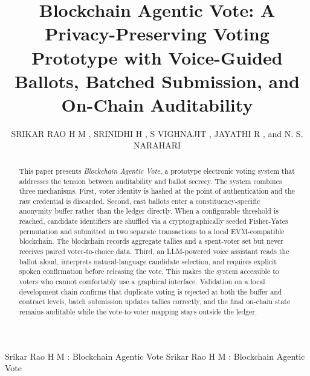 \documentclass{ieeeaccess}
\begin{document}

\title{Blockchain Agentic Vote: A Privacy-Preserving Voting Prototype with Voice-Guided Ballots, Batched Submission, and On-Chain Auditability}

\author{\uppercase{Srikar Rao H M} , \uppercase{Srinidhi H} , \uppercase{S Vighnajit} , \uppercase{Jayathi R} , and \uppercase{N. S. Narahari} }
\address[1]{Department of Computer Science and Engineering, R V College of Engineering, Bengaluru, India (e-mail: srinidhih.cs23@rvce.edu.in)}
\address[2]{Department of Electronics and Instrumentation Engineering, R V College of Engineering, Bengaluru, India (e-mail: svighnajit.ei22@rvce.edu.in)}
\address[3]{Department of Aerospace Engineering, R V College of Engineering, Bengaluru, India (e-mail: jayathir.ae23@rvce.edu.in)}
\address[4]{Department of Industrial Engineering \& Management, R V College of Engineering, Bengaluru, India (e-mail: naraharins@rvce.edu.in)}

\markboth
{Srikar Rao H M \headeretal: Blockchain Agentic Vote}
{Srikar Rao H M \headeretal: Blockchain Agentic Vote}


\begin{abstract}
This paper presents \emph{Blockchain Agentic Vote}, a prototype electronic voting system that addresses the tension between auditability and ballot secrecy. The system combines three mechanisms. First, voter identity is hashed at the point of authentication and the raw credential is discarded. Second, cast ballots enter a constituency-specific anonymity buffer rather than the ledger directly. When a configurable threshold is reached, candidate identifiers are shuffled via a cryptographically seeded Fisher-Yates permutation and submitted in two separate transactions to a local EVM-compatible blockchain. The blockchain records aggregate tallies and a spent-voter set but never receives paired voter-to-choice data. Third, an LLM-powered voice assistant reads the ballot aloud, interprets natural-language candidate selection, and requires explicit spoken confirmation before releasing the vote. This makes the system accessible to voters who cannot comfortably use a graphical interface. Validation on a local development chain confirms that duplicate voting is rejected at both the buffer and contract levels, batch submission updates tallies correctly, and the final on-chain state remains auditable while the vote-to-voter mapping stays outside the ledger.
\end{abstract}
\end{document}
